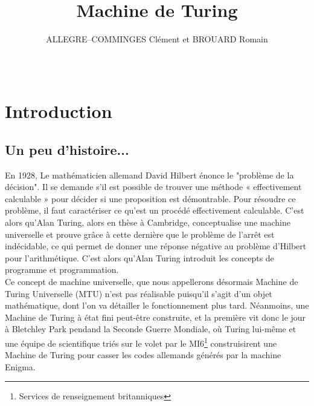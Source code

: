 \documentclass[12pt]{article}
\title{Machine de Turing}
\author{ALLEGRE--COMMINGES Clément et BROUARD Romain}
\date{~}
\begin{document}
	\maketitle
	\tableofcontents
	\section{Introduction}
	\subsection{Un peu d'histoire...}
	En 1928, Le mathématicien allemand David Hilbert énonce le "problème de la décision". Il se demande s'il est possible de trouver une méthode « effectivement calculable » pour décider si une proposition est démontrable. Pour résoudre ce problème, il faut caractériser ce qu'est un procédé effectivement calculable. C'est alors qu'Alan Turing, alors en thèse à Cambridge, conceptualise une machine universelle et prouve grâce à cette dernière que le problème de l'arrêt est indécidable, ce qui permet de donner une réponse négative au problème d'Hilbert pour l'arithmétique. C'est alors qu'Alan Turing introduit les concepts de programme et programmation.\\
	Ce concept de machine universelle, que nous appellerons désormais Machine de Turing Universelle (MTU) n'est pas réalisable puisqu'il s'agit d'un objet mathématique, dont l'on va détailler le fonctionnement plus tard. Néanmoins, une Machine de Turing à état fini peut-être construite, et la première vit donc le jour à Bletchley Park pendand la Seconde Guerre Mondiale, où Turing lui-même et une équipe de scientifique triés sur le volet par le MI6\footnote{Services de renseignement britanniques} construisirent une Machine de Turing pour casser les codes allemands générés par la machine Enigma.\\
	
\end{document}

